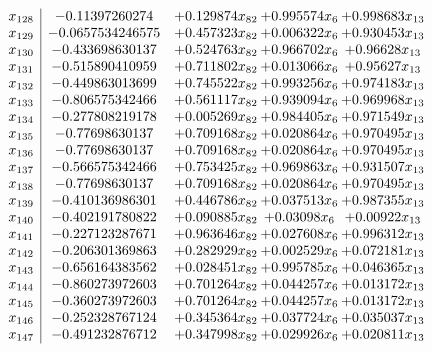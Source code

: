 \documentclass[11pt]{article}
\begin{document}
\[\begin{array}{c| c c@{\hskip 2pt} c@{\hskip 2pt} c@{\hskip 2pt} }
 x_{128}   &  -0.11397260274 & + 0.129874 x_{82} & + 0.995574 x_{6} & + 0.998683 x_{13}\\
 x_{129}   &  -0.0657534246575 & + 0.457323 x_{82} & + 0.006322 x_{6} & + 0.930453 x_{13}\\
 x_{130}   &  -0.433698630137 & + 0.524763 x_{82} & + 0.966702 x_{6} & + 0.96628 x_{13}\\
 x_{131}   &  -0.515890410959 & + 0.711802 x_{82} & + 0.013066 x_{6} & + 0.95627 x_{13}\\
 x_{132}   &  -0.449863013699 & + 0.745522 x_{82} & + 0.993256 x_{6} & + 0.974183 x_{13}\\
 x_{133}   &  -0.806575342466 & + 0.561117 x_{82} & + 0.939094 x_{6} & + 0.969968 x_{13}\\
 x_{134}   &  -0.277808219178 & + 0.005269 x_{82} & + 0.984405 x_{6} & + 0.971549 x_{13}\\
 x_{135}   &  -0.77698630137 & + 0.709168 x_{82} & + 0.020864 x_{6} & + 0.970495 x_{13}\\
 x_{136}   &  -0.77698630137 & + 0.709168 x_{82} & + 0.020864 x_{6} & + 0.970495 x_{13}\\
 x_{137}   &  -0.566575342466 & + 0.753425 x_{82} & + 0.969863 x_{6} & + 0.931507 x_{13}\\
 x_{138}   &  -0.77698630137 & + 0.709168 x_{82} & + 0.020864 x_{6} & + 0.970495 x_{13}\\
 x_{139}   &  -0.410136986301 & + 0.446786 x_{82} & + 0.037513 x_{6} & + 0.987355 x_{13}\\
 x_{140}   &  -0.402191780822 & + 0.090885 x_{82} & + 0.03098 x_{6} & + 0.00922 x_{13}\\
 x_{141}   &  -0.227123287671 & + 0.963646 x_{82} & + 0.027608 x_{6} & + 0.996312 x_{13}\\
 x_{142}   &  -0.206301369863 & + 0.282929 x_{82} & + 0.002529 x_{6} & + 0.072181 x_{13}\\
 x_{143}   &  -0.656164383562 & + 0.028451 x_{82} & + 0.995785 x_{6} & + 0.046365 x_{13}\\
 x_{144}   &  -0.860273972603 & + 0.701264 x_{82} & + 0.044257 x_{6} & + 0.013172 x_{13}\\
 x_{145}   &  -0.360273972603 & + 0.701264 x_{82} & + 0.044257 x_{6} & + 0.013172 x_{13}\\
 x_{146}   &  -0.252328767124 & + 0.345364 x_{82} & + 0.037724 x_{6} & + 0.035037 x_{13}\\
 x_{147}   &  -0.491232876712 & + 0.347998 x_{82} & + 0.029926 x_{6} & + 0.020811 x_{13}\\

\end{array}\]
\end{document}

